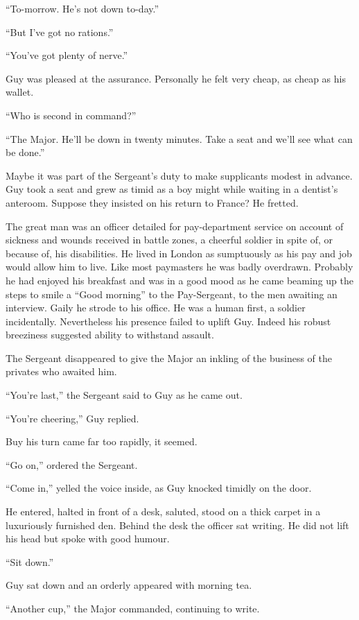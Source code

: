 ``To-morrow. He's not down to-day.''

``But I've got no rations.''

``You've got plenty of nerve.''

Guy was pleased at the assurance. Personally he felt very cheap, as cheap as his wallet.

``Who is second in command?''

``The Major. He'll be down in twenty minutes. Take a seat and we'll see what can be done.''

Maybe it was part of the Sergeant's duty to make supplicants modest in advance. Guy took a seat and grew as timid as a boy might while waiting in a dentist's anteroom. Suppose they insisted on his return to France? He fretted.

The great man was an officer detailed for pay-department service on account of sickness and wounds received in battle zones, a cheerful soldier in spite of, or because of, his disabilities. He lived in London as sumptuously as his pay and job would allow him to live. Like most paymasters he was badly overdrawn. Probably he had enjoyed his breakfast and was in a good mood as he came beaming up the steps to smile a ``Good morning'' to the Pay-Sergeant, to the men awaiting an interview. Gaily he strode to his office. He was a human first, a soldier incidentally. Nevertheless his presence failed to uplift Guy. Indeed his robust breeziness suggested ability to withstand assault.

The Sergeant disappeared to give the Major an inkling of the business of the privates who awaited him.

``You're last,'' the Sergeant said to Guy as he came out.

``You're cheering,'' Guy replied.

Buy his turn came far too rapidly, it seemed.

``Go on,'' ordered the Sergeant.

``Come in,'' yelled the voice inside, as Guy knocked timidly on the door.

He entered, halted in front of a desk, saluted, stood on a thick carpet in a luxuriously furnished den. Behind the desk the officer sat writing. He did not lift his head but spoke with good humour.

``Sit down.''

Guy sat down and an orderly appeared with morning tea.

``Another cup,'' the Major commanded, continuing to write.


